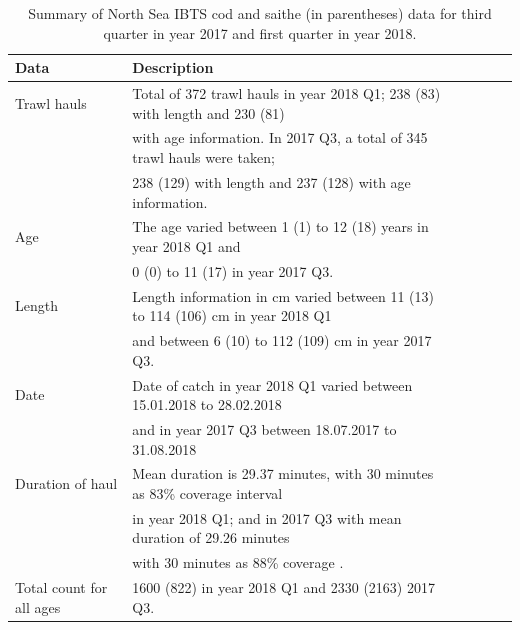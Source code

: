 \documentclass[a4paper 12pt]{article}
\numberwithin{equation}{section}
\begin{document}
 
\clearpage
\begin{small}
\begin{table}[h!]
\caption{Summary of North Sea IBTS cod and saithe (in parentheses) data for third quarter in year 2017 and first quarter in year 2018.}
\begin{tabular}{llllll}
\toprule
\bf Data&\bf Description \\
\midrule
Trawl hauls  & Total of 372 trawl hauls in year 2018 Q1; 238 (83)  with length and 230 (81) \\ & with age information. In 2017 Q3, a total of 345  trawl hauls were taken; \\ & 238 (129) with length and 237 (128) with age information. \\[1.7ex]

Age &The age varied between 1 (1) to 12 (18) years in year 2018 Q1 and \\ & 0 (0) to 11 (17) in year 2017 Q3. \\[1.7ex]

Length & Length information in cm varied between 11 (13) to 114 (106) cm in year 2018 Q1 \\ & and between 6 (10) to 112 (109) cm in year 2017 Q3. \\[1.7ex]

Date&Date of catch in year 2018 Q1 varied between 15.01.2018 to 28.02.2018 \\ & and in year 2017 Q3 between 18.07.2017 to 31.08.2018 \\[1.7ex]

Duration of haul & Mean duration is 29.37 minutes, with 30 minutes as 83\% coverage interval \\ & in year 2018 Q1; and in 2017 Q3 with mean duration of 29.26 minutes \\ & with 30 minutes as 88\% coverage . \\[1.0ex]

Total count for all ages & 1600 (822) in year 2018 Q1 and 2330 (2163) 2017 Q3. \\[0.5ex]
\bottomrule
\end{tabular}
\label{tab:data2018}
\end{table}
\end{small}

\end{document}

